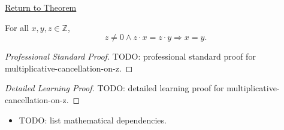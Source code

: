 \newpage
{}
\label{prf:multiplicative-cancellation-on-z}

\begin{remark*}[Return]
\hyperref[cor:multiplicative-cancellation-on-z]{Return to Theorem}
\end{remark*}

\begin{corollary*}
For all $x,y,z\in\mathbb{Z}$,
\[
z\ne 0 \land z\cdot x=z\cdot y \Longrightarrow x=y.
\]
\end{corollary*}

\begin{proof}[Professional Standard Proof]
\LRAProofBodyStart
TODO: professional standard proof for multiplicative-cancellation-on-z.
\end{proof}

\begin{proof}[Detailed Learning Proof]
\LRAProofBodyStart
TODO: detailed learning proof for multiplicative-cancellation-on-z.
\end{proof}

\begin{remark*}
\end{remark*}

\begin{dependencies}
\begin{itemize}
  \item TODO: list mathematical dependencies.
\end{itemize}
\end{dependencies}

\clearpage
